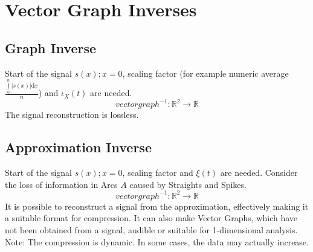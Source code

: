 \documentclass{report}
\begin{document}
\chapter{Vector Graph Inverses}
\section{Graph Inverse}
Start of the signal $s(x);x=0$, scaling factor (for example numeric average $\frac{\int \limits _{0}^{n}\vert s(x)\vert \mathrm{d}x}{n}$) and $\iota_{X}(t)$ are needed.
\begin{equation}
vectorgraph^{-1}: \mathbb{R}^2 \rightarrow \mathbb{R}
\end{equation}
The signal reconstruction is lossless.
\section{Approximation Inverse}
Start of the signal $s(x);x=0$, scaling factor and $\xi(t)$ are needed. Consider the loss of information in Arcs $A$ caused by Straights and Spikes.
\begin{equation}
vectorgraph^{-1}: \mathbb{R}^2 \rightarrow \mathbb{R}
\end{equation}
It is possible to reconstruct a signal from the approximation, effectively making it a suitable format for compression. It can also make Vector Graphs, which have not been obtained from a signal, audible or suitable for 1-dimensional analysis.\\
Note: The compression is dynamic. In some cases, the data may actually increase.
\end{document}
